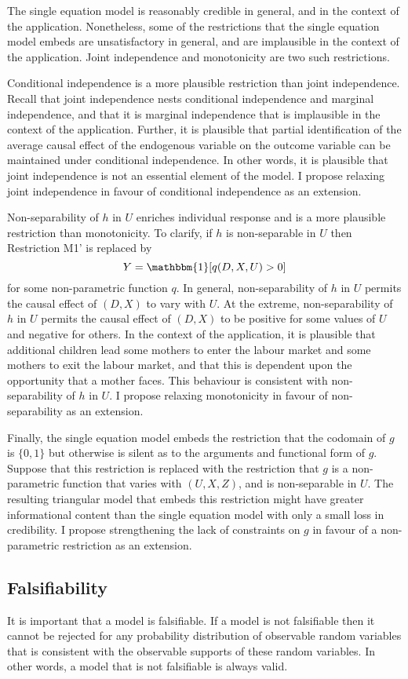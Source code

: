 \documentclass[10pt,a4paper,twoside]{article}
\numberwithin{equation}{section}
\begin{document}
The single equation model is reasonably credible in general, and in the context of the application. Nonetheless, some of the restrictions that the single equation model embeds are unsatisfactory in general, and are implausible in the context of the application. Joint independence and monotonicity are two such restrictions. 

Conditional independence is a more plausible restriction than joint independence. Recall that joint independence nests conditional independence and marginal independence, and that it is marginal independence that is implausible in the context of the application. Further, it is plausible that partial identification of the average causal effect of the endogenous variable on the outcome variable can be maintained under conditional independence. In other words, it is plausible that joint independence is not an essential element of the model. I propose relaxing joint independence in favour of conditional independence as an extension.

Non-separability of $h$ in $U$ enriches individual response and is a more plausible restriction than monotonicity. To clarify, if $h$ is non-separable in $U$ then Restriction M1' is replaced by  
\[Y=\mathbbm{1}[q(D,X,U)>0]\]
for some non-parametric function $q$. In general, non-separability of $h$ in $U$ permits the causal effect of $(D,X)$ to vary with $U$. At the extreme, non-separability of $h$ in $U$ permits the causal effect of $(D,X)$ to be positive for some values of $U$ and negative for others. In the context of the application, it is plausible that additional children lead some mothers to enter the labour market and some mothers to exit the labour market, and that this is dependent upon the opportunity that a mother faces. This behaviour is consistent with non-separability of $h$ in $U$. I propose relaxing monotonicity in favour of non-separability as an extension.

Finally, the single equation model embeds the restriction that the codomain of $g$ is $\lbrace 0,1\rbrace$ but otherwise is silent as to the arguments and functional form of $g$. Suppose that this restriction is replaced with the restriction that $g$ is a non-parametric function that varies with $(U,X,Z)$, and is non-separable in $U$. The resulting triangular model that embeds this restriction might have greater informational content than the single equation model with only a small loss in credibility. I propose strengthening the lack of constraints on $g$ in favour of a non-parametric restriction as an extension.
\subsection{Falsifiability}
It is important that a model is falsifiable. If a model is not falsifiable then it cannot be rejected for any probability distribution of observable random variables that is consistent with the observable supports of these random variables. In other words, a model that is not falsifiable is always valid. 
\end{document}
